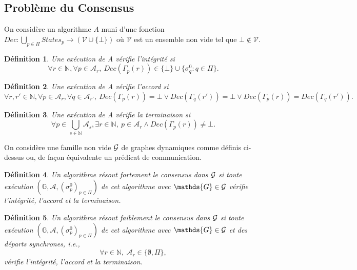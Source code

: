 \documentclass{article}
\newtheorem{definition}{Définition}
\begin{document}
\subsection{Probl\`eme du Consensus}

On considère un algorithme $A$ muni d'une fonction
	$Dec : \bigcup\limits_{p \in \Pi} States_p  \rightarrow (\mathcal{V} \cup \{\bot\})$ 
	où $\mathcal{V}$ est un ensemble non vide tel que $\bot \notin \mathcal{V} $.

\begin{definition}
	Une exécution de A \emph{vérifie  l'intégrité} si 
	$$ \forall r \in \mathds{N},\forall p \in \mathcal{A}_{r}, \ Dec(\Gamma_p(r)) \in \{ \bot \} \cup  \{ \sigma^0_q :  q \in \Pi \}  .$$
\end{definition}

\begin{definition}
	Une exécution de A  \emph{vérifie l'accord} si
	$$\forall r, r'  \in \mathds{N}, \forall p \in \mathcal{A}_{r}, \forall q \in \mathcal{A}_{r'}, 
		\ Dec(\Gamma_p(r)) = \bot \vee Dec(\Gamma_q(r')) = \bot \vee Dec(\Gamma_p(r)) = Dec(\Gamma_q(r')) .$$
\end{definition}

\begin{definition}
	Une exécution de A \emph{vérifie la terminaison} si
	$$ \forall p \in \bigcup\limits_{s \in \mathds{N}} \mathcal{A}_s, \exists r \in \mathds{N}, \ 
		p \in \mathcal{A}_r \wedge Dec(\Gamma_p(r)) \neq \bot .  $$
\end{definition}

On consid\`ere une famille non vide ${\cal G}$ de graphes dynamiques comme d\'efinis ci-dessus
	ou, de fa\c{c}on \'equivalente un pr\'edicat de communication. %
	
\begin{definition}
	Un algorithme \emph{résout fortement le consensus dans ${\cal G}$} si toute exécution 
	$( \mathds{G} ,  \mathcal{A} , (\sigma^0_p)_{p \in \Pi})$    de cet algorithme
	avec $ \mathds{G} \in {\cal G}$  vérifie l'intégrité, l'accord et la terminaison.
\end{definition}

\begin{definition}
	Un algorithme \emph{résout faiblement le consensus dans ${\cal G}$} si toute exécution 
	$( \mathds{G} ,  \mathcal{A} , (\sigma^0_p)_{p \in \Pi})$     de cet algorithme  avec
	$ \mathds{G} \in {\cal G}$  et des d\'eparts synchrones, i.e., 
	$$ \forall r \in \mathds{N}, \  \mathcal{A}_r \in \{\emptyset, \Pi\}  ,$$ 
	vérifie l'intégrité, l'accord et la terminaison.
\end{definition}
\end{document}
